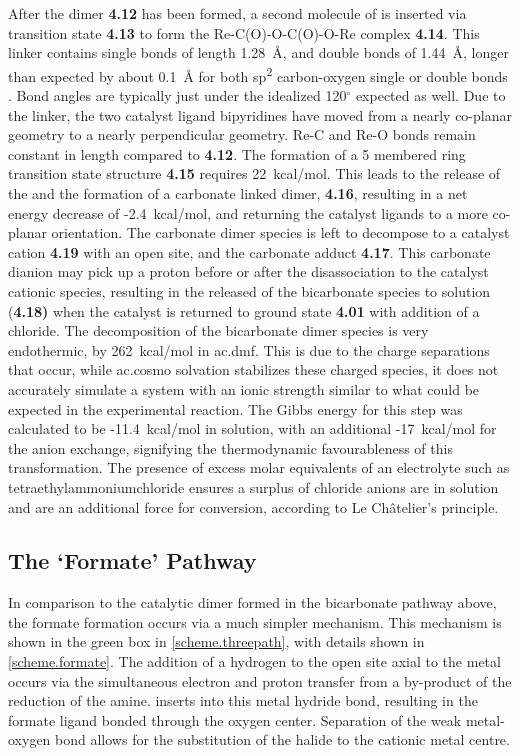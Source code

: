 After the dimer \textbf{4.12} has been formed, a second molecule of  is inserted via transition state \textbf{4.13} to form the Re-C(O)-O-C(O)-O-Re complex \textbf{4.14}. This  linker contains  single bonds of length 1.28~\r{A}, and  double bonds of 1.44~\r{A}, longer than expected by about 0.1~\r{A} for both sp\textsuperscript{2} carbon-oxygen single or double bonds \autocite{crc1998}. Bond angles are typically just under the idealized 120$^\circ$ expected as well. Due to the linker, the two catalyst ligand bipyridines have moved from a nearly co-planar geometry to a nearly perpendicular geometry. Re-C and Re-O bonds remain constant in length compared to \textbf{4.12}. The formation of a 5 membered ring transition state structure \textbf{4.15} requires 22~kcal/mol. This leads to the release of the  and the formation of a carbonate linked dimer, \textbf{4.16}, resulting in a net energy decrease of -2.4~kcal/mol, and returning the catalyst ligands to a more co-planar orientation. The carbonate dimer species is left to decompose to a catalyst cation \textbf{4.19} with an open site, and the carbonate adduct \textbf{4.17}. This carbonate dianion may pick up a proton before or after the disassociation to the catalyst cationic species, resulting in the released of the bicarbonate species to solution (\textbf{4.18)} when the catalyst is returned to ground state \textbf{4.01} with addition of a chloride. The decomposition of the bicarbonate dimer species is very endothermic, by 262~kcal/mol in \gls{ac.dmf}. This is due to the charge separations that occur, while \gls{ac.cosmo} solvation stabilizes these charged species, it does not accurately simulate a system with an ionic strength similar to what could be expected in the experimental reaction. The Gibbs energy for this step was calculated to be -11.4~kcal/mol in solution, with an additional -17~kcal/mol for the anion exchange, signifying the thermodynamic favourableness of this transformation. The presence of excess molar equivalents of an electrolyte such as tetraethylammoniumchloride ensures a surplus of chloride anions are in solution and are an additional force for conversion, according to Le Ch\^{a}telier's principle.

\subsection{The `Formate' Pathway}\label{ss.formate}
In comparison to the catalytic dimer formed in the bicarbonate pathway above, the formate formation occurs via a much simpler mechanism. This mechanism is shown in the green box in \autoref{scheme.threepath}, with details shown in \autoref{scheme.formate}. The addition of a hydrogen to the open site axial to the metal occurs via the simultaneous electron and proton transfer from a by-product of the reduction of the amine.  inserts into this metal hydride bond, resulting in the formate ligand bonded through the oxygen center\autocite{sullivan1984, sullivan1986, creutz2007}. Separation of the weak metal-oxygen bond allows for the substitution of the halide to the cationic metal centre. 

